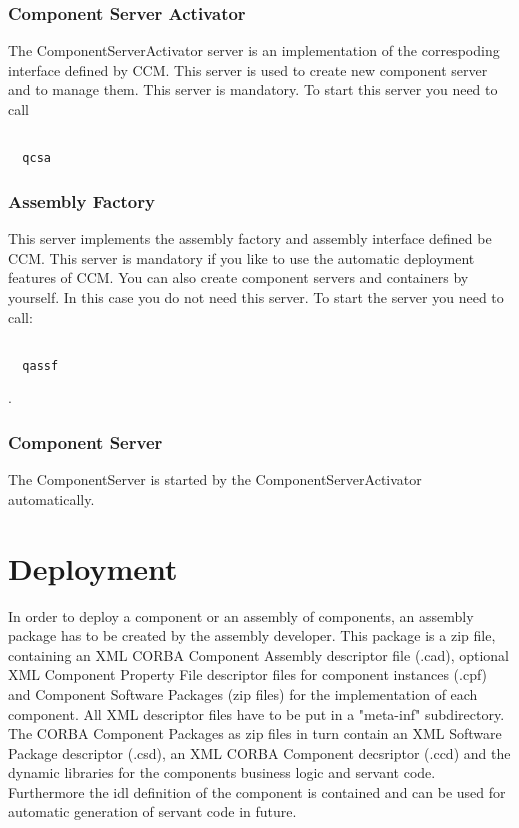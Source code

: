 \documentclass[12pt,a4paper]{report}
\begin{document}
\subsection{Component Server Activator}
\label{sec:ComponentServerActivator}

The ComponentServerActivator server is an implementation of the correspoding interface defined by CCM. This server is used to create new component server and to manage them. This server is mandatory. To start this server you need to call 

\small
\begin{verbatim}

  qcsa

\end{verbatim}
\normalsize

\subsection{Assembly Factory}
\label{sec:AssemblyFactory}

This server implements the assembly factory and assembly interface defined be CCM. This server is mandatory if you like to use the automatic deployment features of CCM. You can also create component servers and containers by yourself. In this case you do not need this server. To start the server you need to call:

\small
\begin{verbatim}

  qassf

\end{verbatim}
\normalsize

.

\subsection{Component Server}
\label{sec:ComponentServer}

The ComponentServer is started by the ComponentServerActivator automatically.


\chapter{Deployment}
\label{sec:Deployment}

In order to deploy a component or an assembly of components, an assembly package has to be created by the assembly developer. This package is a zip file, containing an XML CORBA Component Assembly descriptor file (.cad), optional XML Component Property File descriptor files for component instances (.cpf) and Component Software Packages (zip files) for the implementation of each component. All XML descriptor files have to be put in a "meta-inf" subdirectory.
The CORBA Component Packages as zip files in turn contain an XML Software Package descriptor (.csd), an XML CORBA Component decsriptor (.ccd) and the dynamic libraries for the components business logic and servant code. Furthermore the idl definition of the component is contained and can be used for automatic generation of servant code in future.
\end{document}
